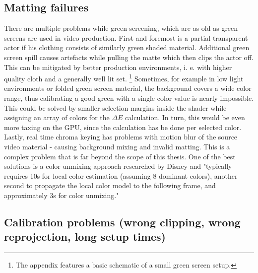 \subsection{Matting failures}

There are multiple problems while green screening, which are as old as green 
screens are used in video production. First and foremost is a partial 
transparent actor if his clothing consists of similarly green shaded material.
\newline
Additional green screen spill causes artefacts while pulling the matte which 
then clips the actor off. This can be mitigated by better production 
environments, i. e. with higher quality cloth and a generally well lit set. 
\footnote{The appendix features a basic schematic of a small green screen 
setup.}
\newline
Sometimes, for example in low light environments or folded green screen 
material, the background covers a wide color range, thus calibrating a good 
green with a single color value is nearly impossible. This could be solved by 
smaller selection margins inside the shader while assigning an array of colors 
for the $\Delta E$ calculation. In turn, this would be even more taxing on the 
GPU, since the calculation has be done per selected color.
\newline
Lastly, real time chroma keying has problems with motion blur of the source 
video material - causing background mixing and invalid matting. This is a 
complex problem that is far beyond the scope of this thesis. One of the best 
solutions is a color unmixing approach researched by Disney and "typically 
requires 10s for local color estimation (assuming 8 dominant colors), another 
second to propagate the local color model to the following frame, and 
approximately 3s for color unmixing." \cite{disney:unmixing:2017}

\subsection{Calibration problems (wrong clipping, wrong reprojection, long 
setup times)}

